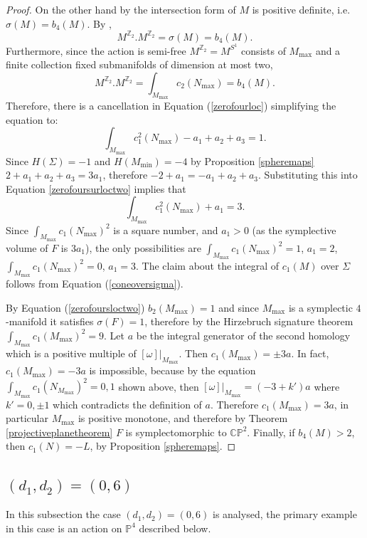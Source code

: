 \documentclass[12pt]{article}
\begin{document}
\begin{proof}
On the other hand by \cite[Theorem 3.4]{L2} the intersection form of $M$ is positive definite, i.e. $\sigma(M) = b_{4}(M)$. By \cite[Main Result]{JO}, $$M^{\mathbb{Z}_2}.M^{\mathbb{Z}_2} = \sigma(M) = b_{4}(M). $$ Furthermore,  since the action is semi-free $M^{\mathbb{Z}_2} =M^{S^1}$ consists of $M_{\max}$ and a finite collection fixed submanifolds of dimension at most two, $$M^{\mathbb{Z}_2}.M^{\mathbb{Z}_2} = \int_{M_{\max}} c_{2}(N_{\max}) = b_{4}(M).$$  Therefore, there is a cancellation in Equation (\ref{zerofourloc}) simplifying the equation to:  \begin{equation}\label{zerofoursurloctwo}   \int_{M_{\max}} c_{1}^2(N_{\max})  -a_1 + a_2 + a_3 = 1.  \end{equation} Since $H(\Sigma)=-1$ and $H(M_{\min}) =-4$ by Proposition \ref{spheremaps} $2+ a_1 + a_2 + a_3 = 3a_1$, therefore $-2 + a_1 = -a_1 + a_2 + a_3 $. Substituting this into Equation \ref{zerofoursurloctwo}  implies that \begin{equation} \label{coneoversigma} \int_{M_{\max}} c_{1}^2(N_{\max}) + a_1  = 3. \end{equation} Since $\int_{M_{\max}} c_{1}(N_{\max})^2$ is a square number, and $a_1>0$ (as the symplective volume of $F$ is $3a_1$), the only possibilities are $\int_{M_{\max}} c_{1}(N_{\max})^2 =1$, $a_{1}=2$,  $\int_{M_{\max}} c_{1}(N_{\max})^2 =0$, $a_{1}=3$. The claim about the integral of $c_{1}(M)$ over $\Sigma$ follows from Equation (\ref{coneoversigma}).


By Equation (\ref{zerofoursloctwo}) $b_{2}(M_{\max})=1$ and since $M_{\max}$ is a symplectic $4$-manifold it satisfies $\sigma(F)=1$, therefore by the Hirzebruch signature theorem $\int_{M_{\max}} c_{1}(M_{\max})^2 = 9.$ Let $a$ be the integral generator of the second homology which is a positive multiple of $[\omega]|_{M_{\max}}$. Then $c_{1}(M_{\max}) = \pm 3a$. In fact, $c_{1}(M_{\max})=-3a$ is impossible, because by the equation $\int_{M_{\max}} c_{1}(N_{M_{\max}})^2 =0,1$ shown above, then $[\omega]|_{M_{\max}} = (-3 + k')a$ where $k'=0,\pm1$ which contradicts the definition of $a$. Therefore $c_{1}(M_{\max})=3a$, in particular $M_{\max}$ is positive monotone, and therefore by Theorem \ref{projectiveplanetheorem} $F$ is symplectomorphic to $\mathbb{CP}^2$. Finally, if $b_{4}(M) > 2$, then $c_{1}(N)=-L$, by Proposition \ref{spheremaps}. \end{proof}


\subsection{ $(d_1,d_2) = (0,6)$}
In this subsection the case $(d_1,d_2)=(0,6)$ is analysed, the primary example in this case is an action on $\mathbb{P}^4$ described below.
\end{document}
